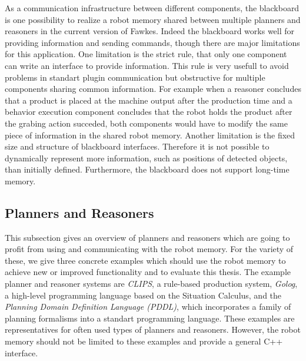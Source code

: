 \documentclass[a4paper,11pt]{article}
\begin{document}
As a communication infrastructure between different components, the
blackboard is one possibility to realize a robot memory shared between
multiple planners and reasoners in the current version of
Fawkes. Indeed the blackboard works well for providing information and
sending commands, though there are major limitations for this
application. One limitation is the strict rule, that only one
component can write an interface to provide information. This rule is
very usefull to avoid problems in standart plugin communication but
obstructive for multiple components sharing common information. For
example when a reasoner concludes that a product is placed at the
machine output after the production time and a behavior execution
component concludes that the robot holds the product after the grabing
action succeded, both components would have to modify the same piece
of information in the shared robot memory. Another limitation is the
fixed size and structure of blackboard interfaces. Therefore it is not
possible to dynamically represent more information, such as positions
of detected objects, than initially defined. Furthermore, the blackboard
does not support long-time memory.

\subsection{Planners and Reasoners}
\label{sec:planners}
This subsection gives an overview of planners and reasoners which are
going to profit from using and communicating with the robot
memory. For the variety of these, we give three concrete
examples which should use the robot memory to achieve new or improved
functionality and to evaluate this thesis. The example planner and
reasoner systems are \emph{CLIPS}, a rule-based production system,
\emph{Golog}, a high-level programming language based on the Situation
Calculus, and the \emph{Planning Domain Definition Language (PDDL)},
which incorporates a family of planning formalisms into a standart
programming language. These examples are representatives for often
used types of planners and reasoners. However, the robot memory should
not be limited to these examples and provide a general C++ interface.
\end{document}
